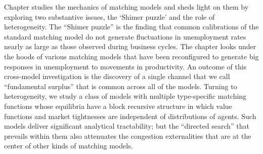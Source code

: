 Chapter  studies the mechanics of
matching models and sheds light on them by exploring  two substantive issues,
the `Shimer puzzle' and the role of heterogeneity.
The ``Shimer puzzle'' is  the finding that common calibrations of the standard
matching model do not generate fluctuations in unemployment rates
nearly as large as those observed during business cycles. %
The chapter looks under the hoods of various  matching models that
have been reconfigured to generate big responses in unemployment to
movements in productivity. An outcome of this cross-model investigation is the
discovery of a single channel that we call
``fundamental surplus'' that is common across all of the models.
Turning to  heterogeneity,  we study a class of models with multiple   type-specific
matching functions whose equilibria have a block recursive structure in which value
functions and market tightnesses are independent of
distributions of agents. Such models deliver significant analytical tractability; but the
 ``directed search'' that prevails within them  also attenuates the  congestion externalities that
are at the center of other kinds of  matching models.





